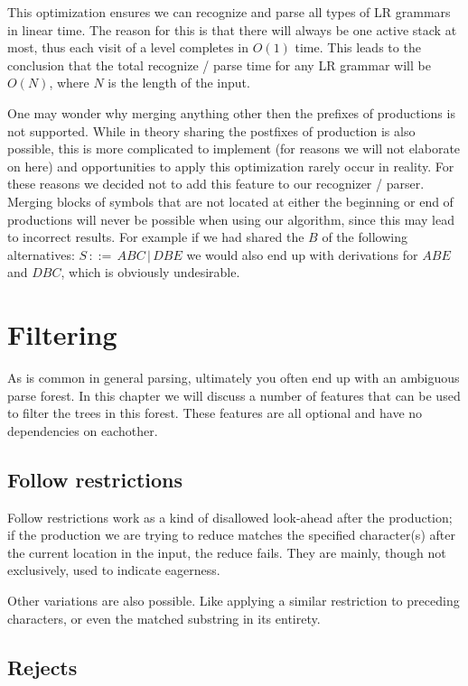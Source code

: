 \documentclass[a4paper,10pt]{article}
\begin{document}
This optimization ensures we can recognize and parse all types of LR grammars in linear time. The reason for this is that there will always be one active stack at most, thus each visit of a level completes in $O(1)$ time. This leads to the conclusion that the total recognize / parse time for any LR grammar will be $O(N)$, where $N$ is the length of the input.

One may wonder why merging anything other then the prefixes of productions is not supported. While in theory sharing the postfixes of production is also possible, this is more complicated to implement (for reasons we will not elaborate on here) and opportunities to apply this optimization rarely occur in reality. For these reasons we decided not to add this feature to our recognizer / parser. Merging blocks of symbols that are not located at either the beginning or end of productions will never be possible when using our algorithm, since this may lead to incorrect results. For example if we had shared the $B$ of the following alternatives: $S\,::=\,ABC\,|\,DBE$ we would also end up with derivations for $ABE$ and $DBC$, which is obviously undesirable.

\section{Filtering}
\label{chap:filtering}

As is common in general parsing, ultimately you often end up with an ambiguous parse forest. In this chapter we will discuss a number of features that can be used to filter the trees in this forest. These features are all optional and have no dependencies on eachother.

\subsection{Follow restrictions}

Follow restrictions work as a kind of disallowed look-ahead after the production; if the production we are trying to reduce matches the specified character(s) after the current location in the input, the reduce fails. They are mainly, though not exclusively, used to indicate eagerness.

Other variations are also possible. Like applying a similar restriction to preceding characters, or even the matched substring in its entirety.

\subsection{Rejects}
\end{document}
